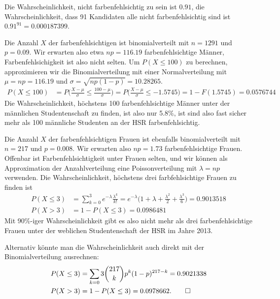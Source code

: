 \begin{loesung}
\begin{teilaufgaben}
\item
Die Wahrscheinlichkeit, nicht farbenfehlsichtig zu sein ist $0.91$, die
Wahrscheinlichkeit, dass 91 Kandidaten alle nicht farbenfehlsichtig sind
ist $0.91^{91}=0.000187399$.
\item
Die Anzahl $X$ der farbenfehlsichtigen ist binomialverteilt mit $n=1291$ und
$p=0.09$. Wir erwarten also etwa $np=116.19$ farbenfehlsichtige Männer,
Farbenfehlsichigkeit ist also nicht selten. Um $P(X\le 100)$ zu
berechnen, approximieren wir die Binomialverteilung mit einer Normalverteilung
mit $\mu=np=116.19$ und $\sigma=\sqrt{np(1-p)}=10.28265$.
\begin{align*}
P(X\le 100)
&=
P\biggl(
\frac{X-\mu}{\sigma}\le \frac{100-\mu}{\sigma}
\biggr)
=
P\biggl(
\frac{X-\mu}{\sigma}\le -1.5745
\biggr)
=
1-F(1.5745)
=
0.0576744
\end{align*}
Die Wahrscheinlichkeit, höchstens 100 farbenfehlsichtige Männer unter
der männlichen Studentenschaft zu finden, ist also nur 5.8\%, ist sind
also fast sicher mehr als 100 männliche Studenten an der HSR
farbenfehlsichtig.
\item
Die Anzahl $X$ der farbenfehlsichtigen Frauen ist ebenfalls binomialverteilt
mit $n=217$ und $p=0.008$. Wir erwarten also $np=1.73$ farbenfehlsichtige
Frauen. Offenbar ist Farbenfehlsichtigkeit unter Frauen selten, und wir
können als Approximation der Anzahlverteilung eine Poissonverteilung mit
$\lambda = np$ verwenden.
Die Wahrscheinlichkeit, höchstens drei farbfehlsichtige Frauen zu finden
ist
\begin{align*}
P(X\le 3)&=\sum_{k=0}^3 e^{-\lambda}\frac{\lambda^k}{k!}=
e^{-\lambda}\biggl(
1+\lambda +\frac{\lambda^2}{2}+\frac{\lambda^3}{6}
\biggr)
=
0.9013518
\\
P(X>3)&=1-P(X\le 3)=
0.0986481
\end{align*}
Mit 90\%-iger Wahrscheinlichkeit gibt es also nicht mehr als drei
farbenfehlsichtige Frauen unter der weblichen Studentenschaft
der HSR im Jahre 2013.

Alternativ könnte man die Wahrscheinlichkeit auch direkt mit der 
Binomialverteilung ausrechnen:
\begin{align*}
P(X\le 3)
&=
\sum_{k=0}3\binom{217}{k}p^k(1-p)^{217-k}=0.9021338
\\
P(X>3)&=1-P(X\le 3)=0.0978662.
\qedhere
\end{align*}
\end{teilaufgaben}
\end{loesung}


